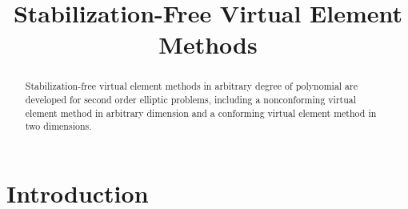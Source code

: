 \documentclass[10pt]{amsart}
\numberwithin{equation}{section}
\begin{document}
\title[Stabilization-Free VEM]{Stabilization-Free Virtual Element Methods}





\begin{abstract}
Stabilization-free virtual element methods in arbitrary degree of polynomial are developed for second order elliptic problems, including a nonconforming virtual element method in arbitrary dimension and a conforming virtual element method in two dimensions.

\end{abstract}



\maketitle

\tableofcontents

\section{Introduction}
\end{document}
